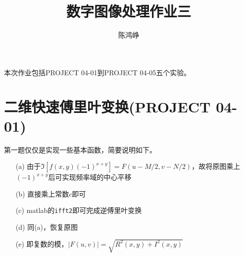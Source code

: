 \documentclass[logo,reportComp]{thesis}
\title{数字图像处理作业三}
\subtitle{}
\author{陈鸿峥}
\begin{document}
\maketitle
本次作业包括PROJECT 04-01到PROJECT 04-05五个实验。

\section{二维快速傅里叶变换(PROJECT 04-01)}
第一题仅仅是实现一些基本函数，简要说明如下。
\begin{itemize}
    \item [(a)] 由于$\Im[f(x,y)(-1)^{x+y}]=F(u-M/2,v-N/2)$，故将原图乘上$(-1)^{x+y}$后可实现频率域的中心平移
    \item [(b)] 直接乘上常数$c$即可
    \item [(c)] matlab的\verb'ifft2'即可完成逆傅里叶变换
    \item [(d)] 同(a)，恢复原图
    \item [(e)] 即复数的模，$|F(u,v)|=\sqrt{R^2(x,y)+I^2(x,y)}$
\end{itemize}
\end{document}

